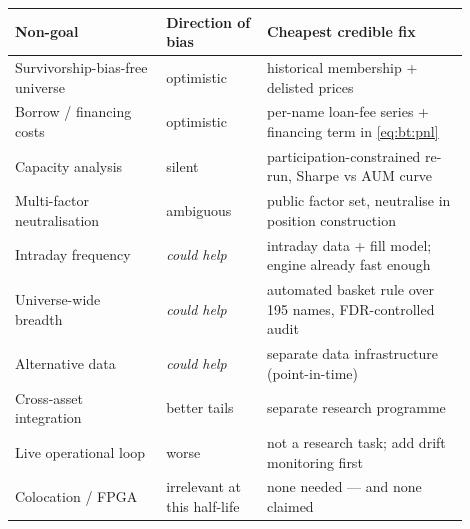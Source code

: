 \begin{center}
\renewcommand{\arraystretch}{1.25}
\small
\begin{tabular}{p{0.30\linewidth}p{0.20\linewidth}p{0.40\linewidth}}
\toprule
Non-goal & Direction of bias & Cheapest credible fix \\
\midrule
Survivorship-bias-free universe & optimistic & historical membership + delisted prices \\
Borrow / financing costs & optimistic & per-name loan-fee series + financing term in \eqref{eq:bt:pnl} \\
Capacity analysis & silent & participation-constrained re-run, Sharpe vs AUM curve \\
Multi-factor neutralisation & ambiguous & public factor set, neutralise in position construction \\
Intraday frequency & \emph{could help} & intraday data + fill model; engine already fast enough \\
Universe-wide breadth & \emph{could help} & automated basket rule over 195 names, FDR-controlled audit \\
Alternative data & \emph{could help} & separate data infrastructure (point-in-time) \\
Cross-asset integration & better tails & separate research programme \\
Live operational loop & worse & not a research task; add drift monitoring first \\
Colocation / FPGA & irrelevant at this half-life & none needed --- and none claimed \\
\bottomrule
\end{tabular}
\end{center}

